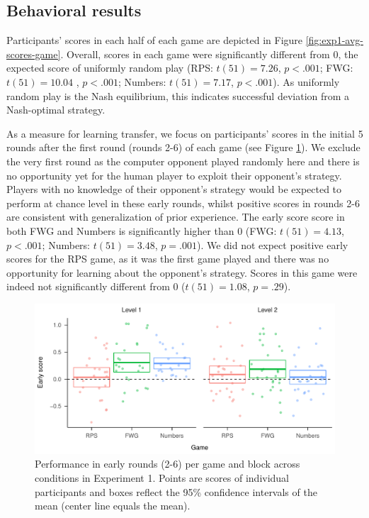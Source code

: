 \documentclass[smallextended]{svjour3}       %
\begin{document}
\hypertarget{behavioral-results}{%
\subsection{Behavioral results}\label{behavioral-results}}

Participants' scores in each half of each game are depicted in Figure
\ref{fig:exp1-avg-scores-game}. Overall, scores in each game were
significantly different from 0, the expected score of uniformly random
play (RPS: \(t(51) = 7.26\), \(p < .001\); FWG: \(t(51) = 10.04\) ,
\(p < .001\); Numbers: \(t(51) = 7.17\), \(p < .001\)). As uniformly
random play is the Nash equilibrium, this indicates successful deviation
from a Nash-optimal strategy.

As a measure for learning transfer, we focus on participants' scores in
the initial 5 rounds after the first round (rounds 2-6) of each game
(see Figure \ref{fig:exp1-early-score-by-opp}). We exclude the very
first round as the computer opponent played randomly here and there is
no opportunity yet for the human player to exploit their opponent's
strategy. Players with no knowledge of their opponent's strategy would
be expected to perform at chance level in these early rounds, whilst
positive scores in rounds 2-6 are consistent with generalization of
prior experience. The early score score in both FWG and Numbers is
significantly higher than 0 (FWG: \(t(51) = 4.13\), \(p < .001\);
Numbers: \(t(51) = 3.48\), \(p = .001\)). We did not expect positive
early scores for the RPS game, as it was the first game played and there
was no opportunity for learning about the opponent's strategy. Scores in
this game were indeed not significantly different from 0
(\(t(51) = 1.08\), \(p = .29\)).

\begin{figure}

{\centering \includegraphics[width=\textwidth]{CBB_v2_files/figure-latex/exp1-early-score-by-opp-1} 

}

\caption{\label{ref:figure4-caption}Performance in early rounds (2-6) per game and block across conditions in Experiment 1. Points are scores of individual participants and boxes reflect the 95\% confidence intervals of the mean (center line equals the mean).}\label{fig:exp1-early-score-by-opp}
\end{figure}
\end{document}
